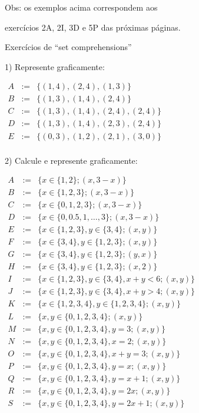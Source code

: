 \documentclass[oneside]{book}
\begin{document}
\bsk

Obs: os exemplos acima correspondem aos

exercícios 2A, 2I, 3D e 5P das próximas páginas.




\newpage

%
 {Exercícios de ``set comprehensions''}

1) Represente graficamente:

$\begin{array}{rcl}
 A & := & \{(1,4), (2,4), (1,3)\} \\
 B & := & \{(1,3), (1,4), (2,4)\} \\
 C & := & \{(1,3), (1,4), (2,4), (2,4)\} \\
 D & := & \{(1,3), (1,4), (2,3), (2,4)\} \\
 E & := & \{(0,3), (1,2), (2,1), (3,0)\} \\
\end{array}
$

\msk

2) Calcule e represente graficamente:

$\begin{array}{rcl}
 A & := & \{x∈\{1,2\}; (x,3-x)\} \\
 B & := & \{x∈\{1,2,3\}; (x,3-x)\} \\
 C & := & \{x∈\{0,1,2,3\}; (x,3-x)\} \\
 D & := & \{x∈\{0,0.5,1, \ldots, 3\}; (x,3-x)\} \\
 E & := & \{x∈\{1,2,3\}, y∈\{3,4\}; (x,y)\} \\
 F & := & \{x∈\{3,4\}, y∈\{1,2,3\}; (x,y)\} \\
 G & := & \{x∈\{3,4\}, y∈\{1,2,3\}; (y,x)\} \\
 H & := & \{x∈\{3,4\}, y∈\{1,2,3\}; (x,2)\} \\
 I & := & \{x∈\{1,2,3\}, y∈\{3,4\}, x+y<6; (x,y)\} \\
 J & := & \{x∈\{1,2,3\}, y∈\{3,4\}, x+y>4; (x,y)\} \\
 K & := & \{x∈\{1,2,3,4\}, y∈\{1,2,3,4\}; (x,y)\} \\
 L & := & \{x,y∈\{0,1,2,3,4\}; (x,y)\} \\
 M & := & \{x,y∈\{0,1,2,3,4\}, y=3; (x,y)\} \\
 N & := & \{x,y∈\{0,1,2,3,4\}, x=2; (x,y)\} \\
 O & := & \{x,y∈\{0,1,2,3,4\}, x+y=3; (x,y)\} \\
 P & := & \{x,y∈\{0,1,2,3,4\}, y=x; (x,y)\} \\
 Q & := & \{x,y∈\{0,1,2,3,4\}, y=x+1; (x,y)\} \\
 R & := & \{x,y∈\{0,1,2,3,4\}, y=2x; (x,y)\} \\
 S & := & \{x,y∈\{0,1,2,3,4\}, y=2x+1; (x,y)\} \\
\end{array}
$
\end{document}
